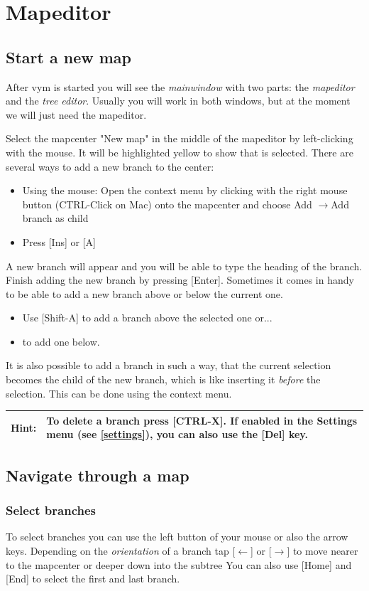 \documentclass[12pt,a4paper]{article}
\newcommand{\hint}[1]{
    \begin{center} 
        \begin{tabular}{|rp{12cm}|} \hline
            {\bf Hint}:& #1\\   \hline
        \end{tabular}
            \marginpar{\Huge !} 
    \end{center} 
}
\newcommand{\vym}{{\sc vym }}
\newcommand{\ra}{$\longrightarrow$}
\newcommand{\la}{$\longleftarrow$}
\newcommand{\key}[1]{[#1]}
\begin{document}
\section{Mapeditor} \label {mapeditor}
\subsection{Start a new map}
After \vym is started you will see the {\em mainwindow} with two parts: the {\em mapeditor} and the
{\em tree editor}. Usually you will work in both windows, but at the
moment we will just need the mapeditor. 

Select the mapcenter "New map" in the middle of the mapeditor by
left-clicking with the mouse. It will be highlighted yellow to show that
is selected. There are several ways to add a new branch to the center:
\begin{itemize}
    \item Using the mouse: Open the context menu by clicking with the
    right mouse button (CTRL-Click on Mac) onto the
    mapcenter and choose Add \ra Add branch as child
    \item Press \key{Ins} or \key{A}
\end{itemize}
A new branch will appear and you will be able to type the heading of the
branch. Finish adding the new branch by pressing \key{Enter}.
Sometimes it comes in handy to be able to add a new branch above or
below the current one. 
\begin{itemize}
    \item Use \key{Shift-A} to add a branch above the selected one or... 
    \item \key{Ctrl-A} to add one below. 
\end{itemize}
It is also possible to add a branch in such a way, that the current
selection becomes the child of the new branch, which is like inserting
it {\em before} the selection. This can be done using the context menu.

\hint{To delete a branch press \key{CTRL-X}. If enabled in the Settings
menu (see \ref{settings}), you can also use the \key{Del} key.}

\subsection{Navigate through a map}
\subsubsection*{Select branches}
To select branches you can use the left button of your mouse or also the
arrow keys. Depending on the {\em orientation} of a branch tap \key{\la}
or \key{\ra} to move nearer to the mapcenter or deeper down into the
subtree  You can also use \key{Home} and \key{End} to select the first
and last branch.
\end{document}
